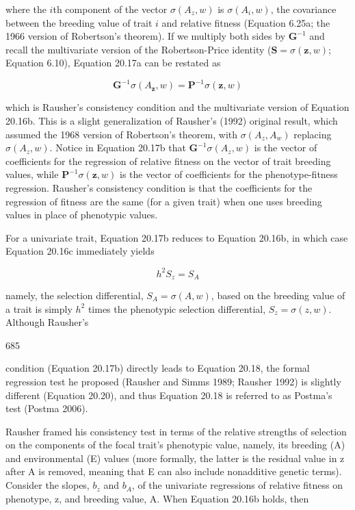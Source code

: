 \documentclass{article}
\begin{document}
where the $i$th component of the vector $\sigma(A_z, w)$ is $\sigma(A_i, w)$, the covariance between the breeding value of trait $i$ and relative fitness (Equation 6.25a; the 1966 version of Robertson's theorem). If we multiply both sides by $\mathbf{G}^{-1}$ and recall the multivariate version of the Robertson-Price identity ($\mathbf{S} = \sigma(\mathbf{z}, w)$; Equation 6.10), Equation 20.17a can be restated as

\begin{equation}
\mathbf{G}^{-1}\sigma(A_{\mathbf{z}},w)=\mathbf{P}^{-1}\sigma(\mathbf{z},w)
\tag{20.17b}
\label{eq:20_17b}
\end{equation}

which is Rausher’s consistency condition and the multivariate version of Equation 20.16b. This is a slight generalization of Rausher’s (1992) original result, which assumed the 1968 version of Robertson’s theorem, with  $ \sigma(A_z, A_w) $ replacing  $ \sigma(A_z, w) $. Notice in Equation 20.17b that  $ \mathbf{G}^{-1} \sigma(A_z, w) $ is the vector of coefficients for the regression of relative fitness on the vector of trait breeding values, while  $ \mathbf{P}^{-1} \sigma(\mathbf{z}, w) $ is the vector of coefficients for the phenotype-fitness regression. Rausher’s consistency condition is that the coefficients for the regression of fitness are the same (for a given trait) when one uses breeding values in place of phenotypic values.

For a univariate trait, Equation 20.17b reduces to Equation 20.16b, in which case Equation 20.16c immediately yields

\begin{equation}
h^{2}S_{z}=S_{A}
\tag{20.18}
\label{eq:20_18}
\end{equation}

namely, the selection differential,  $ S_A = \sigma(A, w) $, based on the breeding value of a trait is simply  $ h^2 $ times the phenotypic selection differential,  $ S_z = \sigma(z, w) $. Although Rausher's

685

condition (Equation 20.17b) directly leads to Equation 20.18, the formal regression test he proposed (Rausher and Simms 1989; Rausher 1992) is slightly different (Equation 20.20), and thus Equation 20.18 is referred to as Postma's test (Postma 2006).

Rausher framed his consistency test in terms of the relative strengths of selection on the components of the focal trait's phenotypic value, namely, its breeding (A) and environmental (E) values (more formally, the latter is the residual value in z after A is removed, meaning that E can also include nonadditive genetic terms). Consider the slopes,  $ b_{z} $ and  $ b_{A} $, of the univariate regressions of relative fitness on phenotype, z, and breeding value, A. When Equation 20.16b holds, then
\end{document}
